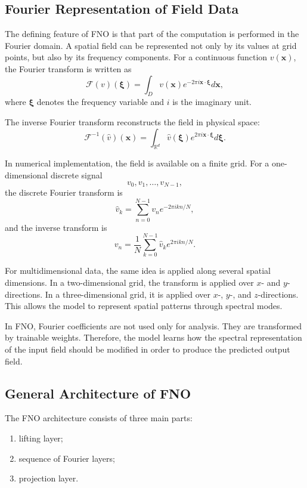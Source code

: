 \documentclass[14pt]{extarticle}
\begin{document}
\subsection{Fourier Representation of Field Data}

The defining feature of FNO is that part of the computation is performed in the Fourier domain. A spatial field can be represented not only by its values at grid points, but also by its frequency components. For a continuous function \(v(\mathbf{x})\), the Fourier transform is written as
\[
\mathcal{F}(v)(\boldsymbol{\xi})
=
\int_{D}
v(\mathbf{x})
e^{-2\pi i \mathbf{x} \cdot \boldsymbol{\xi}}
d\mathbf{x},
\]
where \(\boldsymbol{\xi}\) denotes the frequency variable and \(i\) is the imaginary unit.

The inverse Fourier transform reconstructs the field in physical space:
\[
\mathcal{F}^{-1}(\hat{v})(\mathbf{x})
=
\int_{\mathbb{R}^{d}}
\hat{v}(\boldsymbol{\xi})
e^{2\pi i \mathbf{x} \cdot \boldsymbol{\xi}}
d\boldsymbol{\xi}.
\]

In numerical implementation, the field is available on a finite grid. For a one-dimensional discrete signal
\[
v_0, v_1, \ldots, v_{N-1},
\]
the discrete Fourier transform is
\[
\hat{v}_k
=
\sum_{n=0}^{N-1}
v_n
e^{-2\pi i kn/N},
\]
and the inverse transform is
\[
v_n
=
\frac{1}{N}
\sum_{k=0}^{N-1}
\hat{v}_k
e^{2\pi i kn/N}.
\]

For multidimensional data, the same idea is applied along several spatial dimensions. In a two-dimensional grid, the transform is applied over \(x\)- and \(y\)-directions. In a three-dimensional grid, it is applied over \(x\)-, \(y\)-, and \(z\)-directions. This allows the model to represent spatial patterns through spectral modes.

In FNO, Fourier coefficients are not used only for analysis. They are transformed by trainable weights. Therefore, the model learns how the spectral representation of the input field should be modified in order to produce the predicted output field.

\subsection{General Architecture of FNO}

The FNO architecture consists of three main parts:

\begin{enumerate}
    \item lifting layer;
    \item sequence of Fourier layers;
    \item projection layer.
\end{enumerate}
\end{document}
